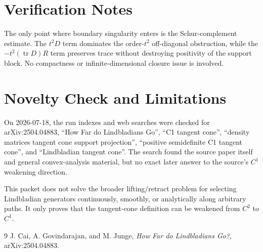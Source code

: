 \documentclass[11pt]{article}
\newcommand{\tr}{\operatorname{tr}}
\begin{document}
\section*{Verification Notes}

The only point where boundary singularity enters is the Schur-complement
estimate.  The $t^2D$ term dominates the order-$t^2$ off-diagonal obstruction,
while the $-t^2(\tr D)R$ term preserves trace without destroying positivity of
the support block.  No compactness or infinite-dimensional closure issue is
involved.

\section*{Novelty Check and Limitations}

On 2026-07-18, the run indexes and web searches were checked for arXiv:2504.04883,
``How Far do Lindbladians Go'', ``C1 tangent cone'', ``density matrices tangent
cone support projection'', ``positive semidefinite C1 tangent cone'', and
``Lindbladian tangent cone''.  The search found the source paper itself and
general convex-analysis material, but no exact later answer to the source's
$C^1$ weakening direction.

This packet does not solve the broader lifting/retract problem for selecting
Lindbladian generators continuously, smoothly, or analytically along arbitrary
paths.  It only proves that the tangent-cone definition can be weakened from
$C^2$ to $C^1$.

\begin{thebibliography}{9}
J. Cai, A. Govindarajan, and M. Junge,
\emph{How Far do Lindbladians Go?},
arXiv:2504.04883.
\end{thebibliography}
\end{document}
